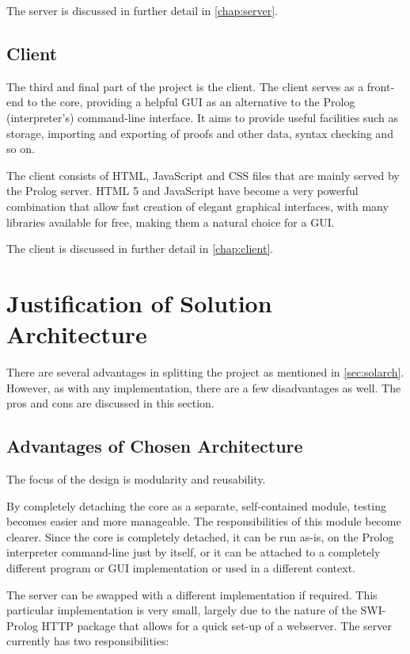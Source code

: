 \documentclass[11pt,twoside,a4paper]{report}
\begin{document}
The server is discussed in further detail in \autoref{chap:server}.

\subsection{Client}
The third and final part of the project is the client. The client serves as a front-end to the core, providing a helpful GUI as an alternative to the Prolog (interpreter's) command-line interface. It aims to provide useful facilities such as storage, importing and exporting of proofs and other data, syntax checking and so on.

The client consists of HTML, JavaScript and CSS files that are mainly served by the Prolog server. HTML 5 and JavaScript have become a very powerful combination that allow fast creation of elegant graphical interfaces, with many libraries available for free, making them a natural choice for a GUI.

The client is discussed in further detail in \autoref{chap:client}.

\section{Justification of Solution Architecture}
There are several advantages in splitting the project as mentioned in \autoref{sec:solarch}. However, as with any implementation, there are a few disadvantages as well. The pros and cons are discussed in this section.

\subsection{Advantages of Chosen Architecture}
The focus of the design is modularity and reusability. 

By completely detaching the core as a separate, self-contained module, testing becomes easier and more manageable. The responsibilities of this module become clearer. Since the core is completely detached, it can be run as-is, on the Prolog interpreter command-line just by itself, or it can be attached to a completely different program or GUI implementation or used in a different context.

The server can be swapped with a different implementation if required. This particular implementation is very small, largely due to the nature of the SWI-Prolog HTTP package that allows for a quick set-up of a webserver. The server currently has two responsibilities:
\end{document}
